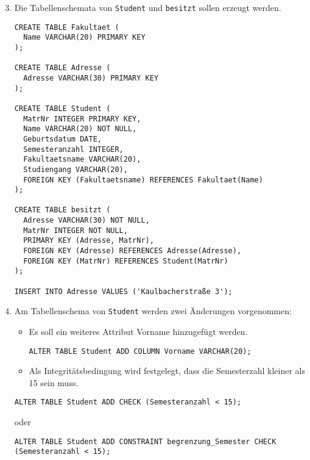\documentclass{lehramt-informatik-aufgabe}
\begin{document}
\begin{enumerate}
\setcounter{enumi}{2}

\item Die Tabellenschemata von \texttt{Student} und \texttt{besitzt}
sollen erzeugt werden.

\begin{liAntwort}
\begin{verbatim}
CREATE TABLE Fakultaet (
  Name VARCHAR(20) PRIMARY KEY
);

CREATE TABLE Adresse (
  Adresse VARCHAR(30) PRIMARY KEY
);

CREATE TABLE Student (
  MatrNr INTEGER PRIMARY KEY,
  Name VARCHAR(20) NOT NULL,
  Geburtsdatum DATE,
  Semesteranzahl INTEGER,
  Fakultaetsname VARCHAR(20),
  Studiengang VARCHAR(20),
  FOREIGN KEY (Fakultaetsname) REFERENCES Fakultaet(Name)
);

CREATE TABLE besitzt (
  Adresse VARCHAR(30) NOT NULL,
  MatrNr INTEGER NOT NULL,
  PRIMARY KEY (Adresse, MatrNr),
  FOREIGN KEY (Adresse) REFERENCES Adresse(Adresse),
  FOREIGN KEY (MatrNr) REFERENCES Student(MatrNr)
);

INSERT INTO Adresse VALUES ('Kaulbacherstraße 3');

\end{verbatim}
\end{liAntwort}

\item Am Tabellenschema von \texttt{Student} werden zwei Änderungen
vorgenommen:

\begin{itemize}
\item Es soll ein weiteres Attribut Vorname hinzugefügt werden.

\begin{liAntwort}
\begin{verbatim}
ALTER TABLE Student ADD COLUMN Vorname VARCHAR(20);
\end{verbatim}
\end{liAntwort}

\item Als Integritätsbedingung wird festgelegt, dass die Semesterzahl
kleiner als 15 sein muss.
\end{itemize}

\begin{liAntwort}
\begin{verbatim}
ALTER TABLE Student ADD CHECK (Semesteranzahl < 15);
\end{verbatim}

oder

\begin{verbatim}
ALTER TABLE Student ADD CONSTRAINT begrenzung_Semester CHECK (Semesteranzahl < 15);
\end{verbatim}
\end{liAntwort}

\end{enumerate}
\end{document}
